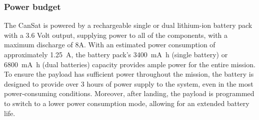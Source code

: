 \subsubsection{Power budget}

The CanSat is powered by a rechargeable single or dual lithium-ion battery pack with a 3.6 Volt output, supplying power to all of the components, with a maximum discharge of 8A. With an estimated power consumption of approximately \SI{1.25}{\ampere}, the battery pack's \SI{3400}{\milli\ampere\hour} (single battery) or \SI{6800}{\milli\ampere\hour} (dual batteries) capacity provides ample power for the entire mission. To ensure the payload has sufficient power throughout the mission, the battery is designed to provide over 3 hours of power supply to the system, even in the most power-consuming conditions. Moreover, after landing, the payload is programmed to switch to a lower power consumption mode, allowing for an extended battery life.


    

